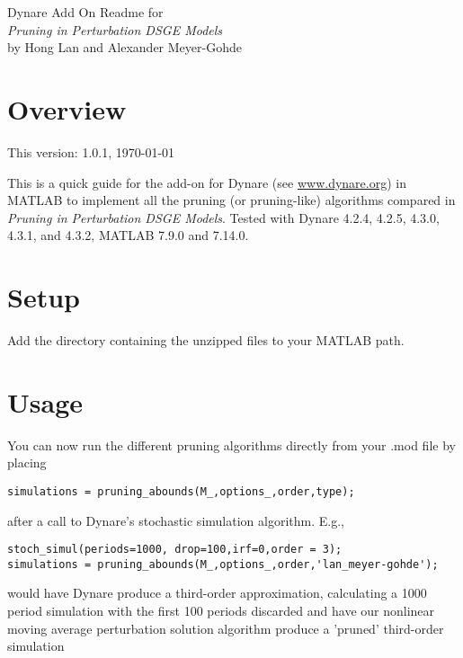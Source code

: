 \documentclass[12pt,leqno,subeqn,aer,aertt,harvard,ulem]{article}
\newlength{\oldbaselineskip}
\newlength{\newbaselineskip}
\begin{document}
    \setlength{\oldbaselineskip}{\baselineskip}
    \setlength{\newbaselineskip}{1.5\baselineskip}
    \setlength{\baselineskip}{\newbaselineskip}
    \abovedisplayskip=2pt
\belowdisplayskip=2pt
\abovedisplayshortskip=2pt
\belowdisplayshortskip=2pt
{\large Dynare Add On Readme for\\ {\it Pruning in Perturbation DSGE Models}}\\
by Hong Lan and Alexander Meyer-Gohde
\section{Overview}
This version: 1.0.1, \today

This is a quick guide for the add-on for Dynare (see \url{www.dynare.org}) in MATLAB to implement all the pruning (or pruning-like) algorithms compared in {\it Pruning in Perturbation DSGE Models}. Tested with Dynare 4.2.4, 4.2.5, 4.3.0, 4.3.1, and 4.3.2, MATLAB 7.9.0 and 7.14.0.

\section{Setup}

Add the directory containing the unzipped files to your MATLAB path.

\section{Usage}

You can now run the different pruning algorithms directly from your .mod file by placing
\begin{verbatim}
simulations = pruning_abounds(M_,options_,order,type);
\end{verbatim}
after a call to Dynare's stochastic simulation algorithm. E.g.,
\begin{verbatim}
stoch_simul(periods=1000, drop=100,irf=0,order = 3);
simulations = pruning_abounds(M_,options_,order,'lan_meyer-gohde');
\end{verbatim}
would have Dynare produce a third-order approximation, calculating a 1000 period simulation with the first 100 periods discarded and have our nonlinear moving average perturbation solution algorithm produce  a 'pruned' third-order simulation
\end{document}
